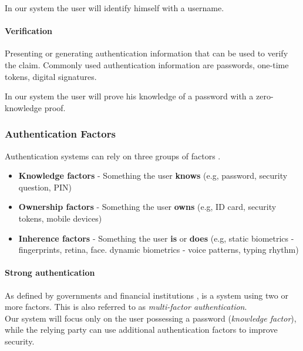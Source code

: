 In our system the user will identify himself with a username.

\paragraph{Verification} Presenting or generating authentication information that can be used to verify the claim.
Commonly used authentication information are passwords, one-time tokens, digital signatures.

In our system the user will prove his knowledge of a password with a zero-knowledge proof.

\subsubsection{Authentication Factors}

Authentication systems can rely on three groups of factors \cite{council2005authentication}.

\begin{itemize}
	\item \textbf{Knowledge factors} - Something the user \textbf{knows} (e.g, password, security question, PIN)
	\item \textbf{Ownership factors} - Something the user \textbf{owns} (e.g, ID card, security tokens, mobile devices)
	\item \textbf{Inherence factors} - Something the user \textbf{is} or \textbf{does} (e.g, static biometrics - fingerprints, retina, face. dynamic biometrics - voice patterns, typing rhythm)
\end{itemize}

\paragraph{Strong authentication} As defined by governments and financial institutions \cite{schaeffer2010national, ecb2013recommendations}, is a system using two or more factors.
This is also referred to as \textit{multi-factor authentication}.\\
\newline
Our system will focus only on the user possessing a password (\textit{knowledge factor}), while the relying party can use additional authentication factors to improve security.

\newpage